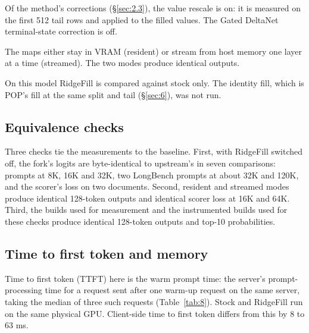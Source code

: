 \documentclass[11pt]{article}
\begin{document}
Of the method's corrections (\S\ref{sec:2.3}), the value rescale is on: it is measured on the first 512 tail rows and applied to the filled values. The Gated DeltaNet terminal-state correction is off.

The maps either stay in VRAM (resident) or stream from host memory one layer at a time (streamed). The two modes produce identical outputs.

On this model RidgeFill is compared against stock only. The identity fill, which is POP's fill at the same split and tail (\S\ref{sec:6}), was not run.


\subsection{Equivalence checks}\label{sec:4.3}
Three checks tie the measurements to the baseline. First, with RidgeFill switched off, the fork's logits are byte-identical to upstream's in seven comparisons: prompts at 8K, 16K and 32K, two LongBench prompts at about 32K and 120K, and the scorer's loss on two documents. Second, resident and streamed modes produce identical 128-token outputs and identical scorer loss at 16K and 64K. Third, the builds used for measurement and the instrumented builds used for these checks produce identical 128-token outputs and top-10 probabilities.


\subsection{Time to first token and memory}\label{sec:4.4}
Time to first token (TTFT) here is the warm prompt time: the server's prompt-processing time for a request sent after one warm-up request on the same server, taking the median of three such requests (Table~\ref{tab:8}). Stock and RidgeFill run on the same physical GPU. Client-side time to first token differs from this by 8 to 63 ms.
\end{document}
